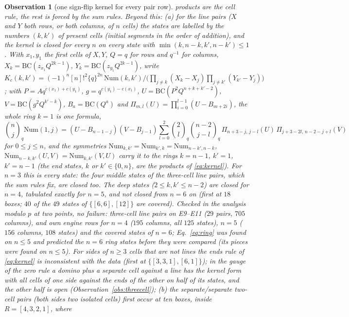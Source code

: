\documentclass[11pt]{article}
\newtheorem{observation}{Observation}
\begin{document}
\begin{observation}[one sign-flip kernel for every pair row]
products are the cell rule, the rest is forced by the sum rules.  Beyond this: (a) for the \emph{line} pairs ($X$ and
$Y$ both rows, or both columns, of $n$ cells) the states are labelled by the numbers $(k,k')$ of present cells (initial
segments in the order of addition), and the kernel is closed for every $n$ on every state with
$\min(k,n-k,k',n-k')\le1$.  With $x_1,y_1$ the first cells of $X,Y$, $Q=q$ for rows and $q^{-1}$ for columns,
$X_k=\mathrm{BC}(z_{x_1}Q^{2k-1})$, $Y_k=\mathrm{BC}(z_{y_1}Q^{2k-1})$, write
$K_c(k,k')=(-1)^n[n]!^2\{q\}^{2n}\,\mathrm{Num}(k,k')\big/\bigl(\prod_{j\ne k}(X_k-X_j)\prod_{j\ne k'}(Y_{k'}-Y_j)\bigr)$;
with $P=Aq^{c(x_1)+c(y_1)}$, $g=q^{c(y_1)-c(x_1)}$, $U=\mathrm{BC}(P^2Q^{n+k+k'-2})$, $V=\mathrm{BC}(g^2Q^{k'-k})$,
$B_a=\mathrm{BC}(Q^a)$ and $\Pi_{m,l}(U)=\prod_{i=0}^{l-1}(U-B_{m+2i})$, the whole ring $k=1$ is one formula,
\begin{equation}\label{eq:ring}
\binom nj_q\mathrm{Num}(1,j)=(U-B_{n-1-j})(V-B_{j-1})\sum_{l=0}^{2}\binom2l_q\binom{n-2}{j-l}_q\,
\Pi_{n+3-j,\,j-l}(U)\,\Pi_{j+3-2l,\,n-2-j+l}(V)
\end{equation}
for $0\le j\le n$, and the symmetries $\mathrm{Num}_{k,k'}=\mathrm{Num}_{k',k}=\mathrm{Num}_{n-k',n-k}$,
$\mathrm{Num}_{n-k,k'}(U,V)=\mathrm{Num}_{k,k'}(V,U)$ carry it to the rings $k=n-1$, $k'=1$, $k'=n-1$ (the end states,
$k$ or $k'\in\{0,n\}$, are the products of \eqref{eq:kernel}).  For $n=3$ this is every state: the four middle states of
the three-cell line pairs, which the sum rules fix, are closed too.  The deep states ($2\le k,k'\le n-2$) are closed for
$n=4$, tabulated exactly for $n=5$, and not closed from $n=6$ on (first at $18$ boxes; $40$ of the $49$ states of
$\{[6,6],[12]\}$ are covered).  Checked in the analysis modulo $p$ at two points, no failure: three-cell line pairs on
E9--E11 ($29$ pairs, $705$ columns), and own engine rows for $n=4$ ($195$ columns, all $125$ states), $n=5$ ($156$
columns, $108$ states) and the covered states of $n=6$; Eq.~\eqref{eq:ring} was found on $n\le5$ and predicted the
$n=6$ ring states before they were compared (its pieces were found on $n\le5$).  For sides of $n\ge3$ cells that are
not lines the ends rule of \eqref{eq:kernel} is inconsistent with the data (first at $\{[3,3,1],[6,1]\}$); in the gauge
of the zero rule a domino plus a separate cell against a line has the kernel form with all cells of one side against the
ends of the other on half of its states, and the other half is open (Observation~\ref{obs:threecell}); (b) the
separate/separate two-cell pairs (both sides two isolated cells) first occur at ten boxes, inside $R=[4,3,2,1]$, where

\end{observation}
\end{document}
